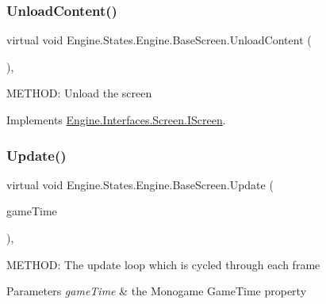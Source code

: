 \mbox{\label{a00550_abd2118fc928f9057ddacbe758b80fe68}} 
\subsubsection{\texorpdfstring{Unload\+Content()}{UnloadContent()}}
{\footnotesize\ttfamily virtual void Engine.\+States.\+Engine.\+Base\+Screen.\+Unload\+Content (\begin{DoxyParamCaption}{ }\end{DoxyParamCaption})\hspace{0.3cm}{\ttfamily [inline]}, {\ttfamily [virtual]}}



M\+E\+T\+H\+OD\+: Unload the screen 



Implements \hyperlink{a00466_aeba867b4e4bd2f0a918b837d93a4e45a}{Engine.\+Interfaces.\+Screen.\+I\+Screen}.

\mbox{\label{a00550_a098ece7d1e112475f6e880c3a672af64}} 
\subsubsection{\texorpdfstring{Update()}{Update()}}
{\footnotesize\ttfamily virtual void Engine.\+States.\+Engine.\+Base\+Screen.\+Update (\begin{DoxyParamCaption}\item[{Game\+Time}]{game\+Time }\end{DoxyParamCaption})\hspace{0.3cm}{\ttfamily [inline]}, {\ttfamily [virtual]}}



M\+E\+T\+H\+OD\+: The update loop which is cycled through each frame 


\begin{DoxyParams}{Parameters}
{\em game\+Time} & the Monogame Game\+Time property\\
\hline
\end{DoxyParams}


